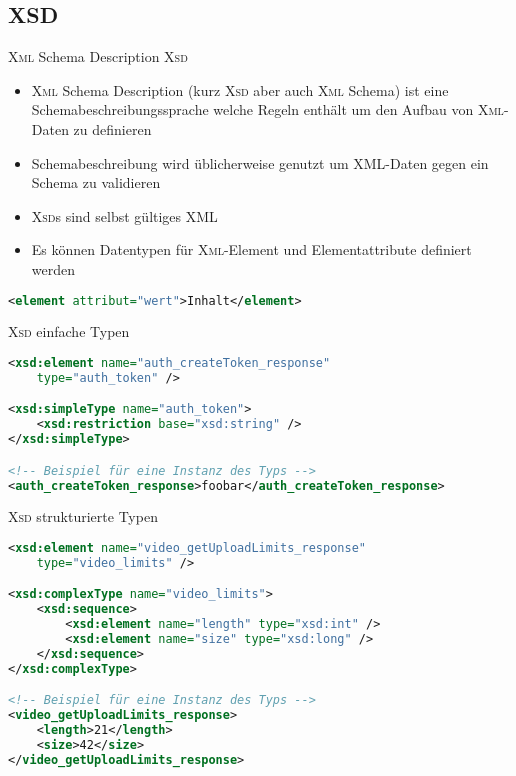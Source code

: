 \subsection{XSD}
\begin{frame}[fragile]{\textsc{Xml} Schema Description \textendash{} \textsc{Xsd}}
    \begin{itemize}
        \item \textsc{Xml} Schema Description (kurz \textsc{Xsd} aber auch \textsc{Xml} Schema) ist eine Schemabeschreibungssprache welche Regeln enthält um den Aufbau von \textsc{Xml}-Daten zu definieren
        \item Schemabeschreibung wird üblicherweise genutzt um XML-Daten gegen ein Schema zu validieren
        \item \textsc{Xsd}s sind selbst gültiges XML
        \item Es können Datentypen für \textsc{Xml}-Element und Elementattribute definiert werden
    \end{itemize}
    \begin{lstlisting}[language=XML, caption=Minimalbeispiel für ein XML-Element]
<element attribut="wert">Inhalt</element>
    \end{lstlisting}
\end{frame}

\begin{frame}[fragile]{\textsc{Xsd} einfache Typen}
    \begin{lstlisting}[language=XML, label=lst:simple, caption=Beispiel für einen einfachen Schematyp aus \cite{facebookXSD}]
<xsd:element name="auth_createToken_response"
    type="auth_token" />

<xsd:simpleType name="auth_token">
    <xsd:restriction base="xsd:string" />
</xsd:simpleType>

<!-- Beispiel für eine Instanz des Typs -->
<auth_createToken_response>foobar</auth_createToken_response>
    \end{lstlisting}
\end{frame}

\begin{frame}[fragile]{\textsc{Xsd} strukturierte Typen}
    \begin{lstlisting}[language=XML, label=lst:complex, caption=Beispiel für einen strukturierten Schematyp aus \cite{facebookXSD}]
<xsd:element name="video_getUploadLimits_response"
    type="video_limits" />

<xsd:complexType name="video_limits">
    <xsd:sequence>
        <xsd:element name="length" type="xsd:int" />
        <xsd:element name="size" type="xsd:long" />
    </xsd:sequence>
</xsd:complexType>

<!-- Beispiel für eine Instanz des Typs -->
<video_getUploadLimits_response>
    <length>21</length>
    <size>42</size>
</video_getUploadLimits_response>
    \end{lstlisting}
\end{frame}
